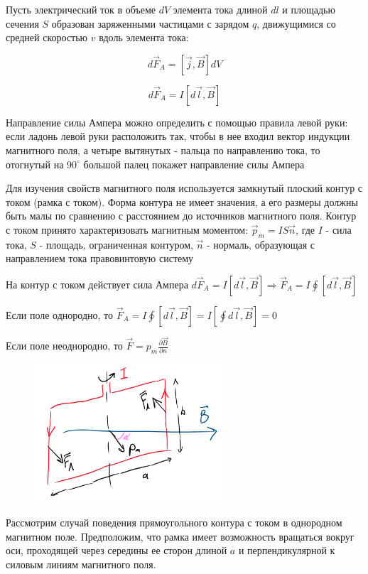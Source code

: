 \documentclass[12pt]{article}
\begin{document}
Пусть электрический ток в объеме $dV$ элемента тока длиной $dl$ и площадью сечения $S$ образован заряженными частицами с зарядом
$q$, движущимися со средней скоростью $v$ вдоль элемента тока: 

\[d\vec{F}_A = [\vec{j}, \vec{B}] dV\]

\[d\vec{F}_A = I [d\vec{l}, \vec{B}]\]

Направление силы Ампера можно определить с помощью правила левой руки: если ладонь левой руки расположить так,
чтобы в нее входил вектор индукции магнитного поля, а четыре вытянутых - пальца по направлению тока, то отогнутый
на $90^\circ$ большой палец покажет направление силы Ампера

Для изучения свойств магнитного поля используется замкнутый плоский контур с током (рамка с током). Форма контура
не имеет значения, а его размеры должны быть малы по сравнению с расстоянием до источников магнитного поля.
Контур с током принято характеризовать магнитным моментом: $\vec{p}_m = I S \vec{n}$, где $I$ - сила тока, $S$ - площадь,
ограниченная контуром, $\vec{n}$ - нормаль, образующая с направлением тока правовинтовую систему

На контур с током действует сила Ампера $d\vec{F}_A = I[d\vec{l}, \vec{B}] \Longrightarrow \vec{F}_A = I \oint [d\vec{l}, \vec{B}]$

Если поле однородно, то $\vec{F}_A = I \oint [d\vec{l}, \vec{B}] = I [\oint d\vec{l}, \vec{B}] = 0$

Если поле неоднородно, то $\vec{F} = p_m \frac{\partial \vec{B}}{\partial n}$

\begin{figure}
    \includegraphics[width=7cm]{physics2/images/physics2_2025_02_24_2}
\end{figure}

\Ex Рассмотрим случай поведения прямоугольного контура с током в однородном магнитном поле. 
Предположим, что рамка имеет возможность вращаться вокруг оси, проходящей через середины ее
сторон длиной $a$ и перпендикулярной к силовым линиям магнитного поля.
\end{document}
